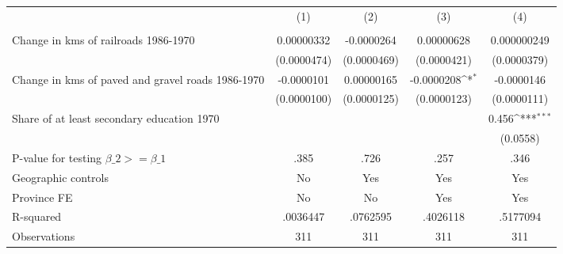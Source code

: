 {
\def\sym#1{\ifmmode^{#1}\else\(^{#1}\)\fi}
\begin{tabular}{l*{4}{c}}
\hline\hline
                &\multicolumn{1}{c}{(1)}&\multicolumn{1}{c}{(2)}&\multicolumn{1}{c}{(3)}&\multicolumn{1}{c}{(4)}\\
                &\multicolumn{1}{c}{}&\multicolumn{1}{c}{}&\multicolumn{1}{c}{}&\multicolumn{1}{c}{}\\
\hline
Change in kms of railroads 1986-1970&0.00000332         &-0.0000264         &0.00000628         &0.000000249         \\
                &(0.0000474)         &(0.0000469)         &(0.0000421)         &(0.0000379)         \\
[1em]
Change in kms of paved and gravel roads 1986-1970&-0.0000101         &0.00000165         &-0.0000208\sym{*}  &-0.0000146         \\
                &(0.0000100)         &(0.0000125)         &(0.0000123)         &(0.0000111)         \\
[1em]
Share of at least secondary education 1970&                  &                  &                  &    0.456\sym{***}\\
                &                  &                  &                  & (0.0558)         \\
\hline
P-value for testing $\beta\_{2} >= \beta\_{1}$&     .385         &     .726         &     .257         &     .346         \\
Geographic controls&       No         &      Yes         &      Yes         &      Yes         \\
Province FE     &       No         &       No         &      Yes         &      Yes         \\
R-squared       & .0036447         & .0762595         & .4026118         & .5177094         \\
Observations    &      311         &      311         &      311         &      311         \\
\hline\hline
\end{tabular}
}
